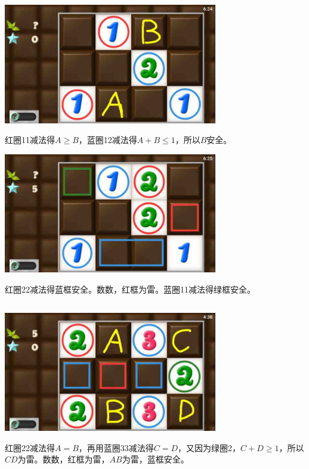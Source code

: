 \subsection{} %
\begin{center}
    \includegraphics[width=0.7\textwidth]{puzzlelow/69-1.jpg}
\end{center}
红圈11减法得$A\ge B$，蓝圈12减法得$A+B\le 1$，所以$B$安全。
\begin{center}
    \includegraphics[width=0.7\textwidth]{puzzlelow/69-2.jpg}
\end{center}
红圈22减法得蓝框安全。数数，红框为雷。蓝圈11减法得绿框安全。

\subsection{} %
\begin{center}
    \includegraphics[width=0.7\textwidth]{puzzlelow/70-1.jpg}
\end{center}
红圈22减法得$A=B$，再用蓝圈33减法得$C=D$，又因为绿圈2，$C+D\ge 1$，所以$CD$为雷。数数，红框为雷，$AB$为雷，蓝框安全。


